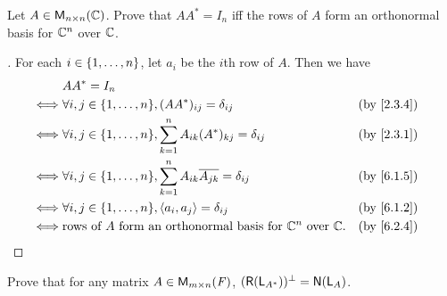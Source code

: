 \begin{ex}\label{ex:6.2.11}
  Let \(A \in \mathsf{M}_{{n} \times n}({\mathbb{C}})\).
  Prove that \(AA^* = I_n\) iff the rows of \(A\) form an orthonormal basis for \(\mathbb{C}^n\) over \(\mathbb{C}\).
\end{ex}

\begin{proof}[]
  For each \(i \in \left\lbrace1, \dots, n\right\rbrace\), let \(a_i\) be the \(i\)th row of \(A\).
  Then we have
  \begin{align*}
         & AA^* = I_n                                                                                                             \\
    \iff & \forall i, j \in \set{1, \dots, n}, (AA^*)_{i j} = \delta_{i j}                          &  & \text{(by \cref{2.3.4})} \\
    \iff & \forall i, j \in \set{1, \dots, n}, \sum_{k = 1}^n A_{i k} (A^*)_{k j} = \delta_{i j}    &  & \text{(by \cref{2.3.1})} \\
    \iff & \forall i, j \in \set{1, \dots, n}, \sum_{k = 1}^n A_{i k} \conj{A_{j k}} = \delta_{i j} &  & \text{(by \cref{6.1.5})} \\
    \iff & \forall i, j \in \set{1, \dots, n}, \inn{a_i, a_j} = \delta_{i j}                        &  & \text{(by \cref{6.1.2})} \\
    \iff & \text{rows of } A \text{ form an orthonormal basis for } \C^n \text{ over } \C.          &  & \text{(by \cref{6.2.4})}
  \end{align*}
\end{proof}

\begin{ex}\label{ex:6.2.12}
  Prove that for any matrix \(A \in \mathsf{M}_{{m} \times n}({\mathit{F}})\), \((\rg{\L_{A^*}})^{\perp} = \ns{\L_A}\).
\end{ex}

